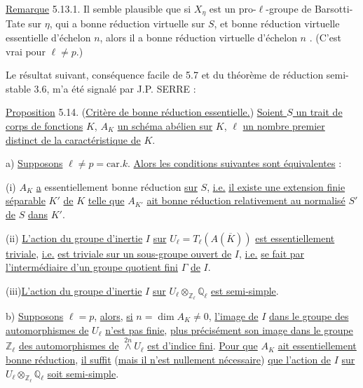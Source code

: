 \underline{Remarque} 5.13.1. Il semble plausible que si $X_\eta$ est un pro-$\ell$-groupe de Barsotti-Tate sur $\eta$, qui a bonne réduction virtuelle sur $S$, et bonne réduction virtuelle essentielle d'échelon $n$, alors il a bonne réduction virtuelle d'échelon $n$ . (C'est vrai pour $\ell \neq p$.)



Le résultat suivant, conséquence facile de 5.7 et du théorème de réduction semi-stable 3.6, m'a été signalé par J.P. SERRE :

\underline{Proposition} 5.14. (\underline{Critère de bonne réduction essentielle.}) \underline{Soient $S$ un trait de corps de fonctions} $K$, $A_K$ \underline{un schéma abélien sur} $K$, $\ell$ \underline{un nombre premier distinct de la caractéristique de} $K$.

a) \underline{Supposons} $\ell \neq p = \mathrm{car}.k.$ \underline{Alors les conditions suivantes sont équivalentes} :

(i) $A_K$ \underline{a} essentiellement bonne réduction \underline{sur} $S$, \underline{i.e.} \underline{il existe une extension finie séparable} $K'$ \underline{de} $K$ \underline{telle que} $A_{K'}$ \underline{ait bonne réduction relativement au normalisé} $S'$ \underline{de} $S$ \underline{dans} $K'$.

(ii) \underline{L'action du groupe d'inertie} $I$ \underline{sur} $U_\ell = T_\ell(A(\overline{K}))$ \underline{est essentiellement triviale}, \underline{i.e.} \underline{est triviale sur un sous-groupe ouvert de} $I$, \underline{i.e.} \underline{se fait par l'intermédiaire d'un groupe quotient fini} $\Gamma$ \underline{de} $I$.

(iii)\underline{L'action du groupe d'inertie} $I$ \underline{sur} $U_\ell \otimes_{\mathbb{Z}_\ell} \mathbb{Q}_\ell$ \underline{est semi-simple}.

b) \underline{Supposons} $\ell = p$, \underline{alors}, \underline{si} $n = \dim A_K \neq 0$, \underline{l'image de} $I$ \underline{dans le groupe des automorphismes de} $U_\ell$ \underline{n'est pas finie}, \underline{plus précisément son image dans le groupe} $\mathbb{Z}_\ell$ \underline{des automorphismes de} $\stackrel{2n}{\wedge} U_\ell$ \underline{est d'indice fini}. \underline{Pour que} $A_K$ \underline{ait essentiellement bonne réduction}, \underline{il suffit} (\underline{mais il n'est nullement nécessaire}) \underline{que l'action de} $I$ \underline{sur} $U_\ell \otimes_{\mathbb{Z}_\ell} \mathbb{Q}_\ell$ \underline{soit semi-simple}.

